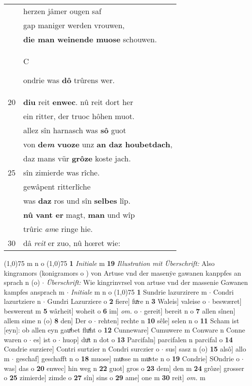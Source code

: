 \documentclass[8pt,a4paper,notitlepage]{article}
\begin{document}
\begin{table}[ht]
\begin{minipage}[t]{0.5\linewidth}
\begin{tabular}{rl}
 & herzen jâmer ougen saf\\ 
 & gap maniger werden vrouwen,\\ 
 & \textbf{die man weinende muose} schouwen.\\ 
 & \begin{large}C\end{large}ondrie was \textbf{dô} trûrens wer.\\ 
20 & \textbf{diu} reit \textbf{enwec}. nû reit dort her\\ 
 & ein ritter, der truoc hôhen muot.\\ 
 & allez sîn harnasch was \textbf{sô} guot\\ 
 & von \textbf{de\textit{m} vuoze} unz \textbf{an daz houbetdach},\\ 
 & daz mans vür \textbf{grôze} koste jach.\\ 
25 & sîn zimierde was rîche.\\ 
 & gewâpent ritterlîche\\ 
 & was \textbf{daz} ros und sîn \textbf{selbes} lîp.\\ 
 & \textbf{nû vant er} magt, \textbf{man} und wîp\\ 
 & trûric \textit{am}e ringe hie.\\ 
30 & dâ \textit{reit} er zuo, nû hœret wie:\\ 
\end{tabular}
\scriptsize
\line(1,0){75} \newline
m n o \newline
\line(1,0){75} \newline
\textbf{1} \textit{Initiale} m  \textbf{19} \textit{Illustration mit Überschrift:} Also kingramors (konigramors o  ) von Artuse vnd der masenẏe gawanen kanppfes an sprach n (o)   $\cdot$ \textit{Überschrift:} Wie kingrinvrsel von artuse vnd der massenie Gawanen kampfes ansprach m   $\cdot$ \textit{Initiale} m n o  \newline
\line(1,0){75} \newline
\textbf{1} Sundrie lazurzirere m  $\cdot$ Condri lazurtziere n  $\cdot$ Gundri Lazurziere o \textbf{2} fiere] fuͯre n \textbf{3} Waleis] valeise o  $\cdot$ beswæret] beswerent m \textbf{5} wârheit] woheit o \textbf{6} im] \textit{om.} o  $\cdot$ gereit] bereit n o \textbf{7} allen sînen] allem sime n (o) \textbf{8} den] Der o  $\cdot$ rehten] rechte n \textbf{10} sêle] selen n o \textbf{11} Scham ist [eyn]: ob allen eyn gauͯbet fluͯht o \textbf{12} Cunneware] Cumuwere m Conware n Conne waren o  $\cdot$ es] ist o  $\cdot$ huop] duͦt n dot o \textbf{13} Parcifaln] parcifalen n parcifal o \textbf{14} Condrie surziere] Contri surtzier n Condri surczier o  $\cdot$ sus] sasz n (o) \textbf{15} alsô] allo m  $\cdot$ geschaf] geschafft n o \textbf{18} muose] muͯsse m muͯste n o \textbf{19} Condrie] SOndrie o  $\cdot$ was] das o \textbf{20} enwec] hin weg n \textbf{22} guot] gros o \textbf{23} dem] den m \textbf{24} grôze] grosser o \textbf{25} zimierde] zimde o \textbf{27} sîn] sins o \textbf{29} ame] one m \textbf{30} reit] \textit{om.} m \newline
\end{minipage}
\end{table}
\end{document}
